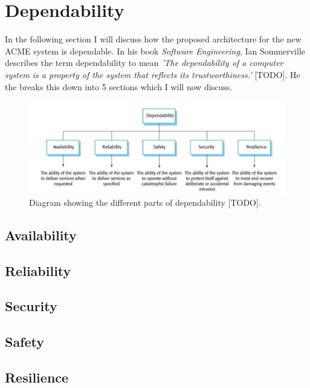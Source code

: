 \section{Dependability}
  \label{sec:Dependability}
  In the following section I will discuss how the proposed architecture for the new ACME system is dependable. In his book \textit{Software Engineering}, Ian 
  Sommerville describes the term dependability to mean \textit{'The dependability of a computer system is a property of the system that reflects its 
  trustworthiness.'} [TODO]. He the breaks this down into 5 sections which I will now discuss.

  \begin{figure}[H]
    \centering
    \includegraphics[width=12cm]{assets/dependability.png}
    \caption{Diagram showing the different parts of dependability [TODO].}
    \label{fig:dependability}
  \end{figure}

  \subsection{Availability}

  \subsection{Reliability}

  \subsection{Security}

  \subsection{Safety}

  \subsection{Resilience}

\newpage

